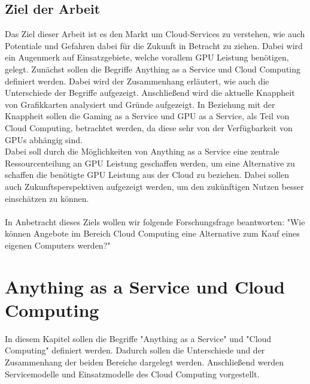 \documentclass[12pt,toc=bib,toc=listof]{scrreprt}
\begin{document}

\section{Ziel der Arbeit} %
\label{sec:ziel_der_arbeit}

Das Ziel dieser Arbeit ist es den Markt um Cloud-Services zu verstehen, wie auch Potentiale und Gefahren 
dabei für die Zukunft in Betracht zu ziehen. Dabei wird ein Augenmerk auf Einsatzgebiete, welche 
vorallem GPU Leistung benötigen, gelegt.
Zunächst sollen die Begriffe Anything as a Service und Cloud Computing definiert werden. 
Dabei wird der Zusammenhang erläutert, wie auch die Unterschiede der Begriffe aufgezeigt.
Anschließend wird die aktuelle Knappheit von Grafikkarten analysiert und Gründe aufgezeigt.
In Beziehung mit der Knappheit sollen die Gaming as a Service und GPU as a Service, als Teil von Cloud Computing, 
betrachtet werden, da diese sehr von der Verfügbarkeit von GPUs abhängig sind.\\
Dabei soll durch die Möglichkeiten von Anything as a Service eine zentrale Ressourcenteilung an GPU Leistung 
geschaffen werden, um eine Alternative zu schaffen die benötigte GPU Leistung aus der Cloud zu beziehen.
Dabei sollen auch Zukunftsperspektiven aufgezeigt werden, um den zukünftigen Nutzen besser einschätzen zu können.\\
\\In Anbetracht dieses Ziels wollen wir folgende Forschungsfrage beantworten: "Wie können Angebote im Bereich Cloud Computing eine Alternative zum Kauf eines eigenen
Computers werden?"


\chapter{Anything as a Service und Cloud Computing} %
\label{sec:Anything as a Service und Cloud Computing}

In diesem Kapitel sollen die Begriffe "Anything as a Service" und "Cloud Computing" definiert werden. Dadurch 
sollen die Unterschiede und der Zusammenhang der beiden Bereiche dargelegt werden. Anschließend werden Servicemodelle
und Einsatzmodelle des Cloud Computing vorgestellt.
\end{document}
